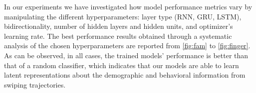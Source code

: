 \documentclass[sn-mathphys, pdflatex]{sn-jnl}
\begin{document}
In our experiments we have investigated how model performance metrics vary
by manipulating the different hyperparameters: layer type (RNN, GRU, LSTM), bidirectionality, number of hidden layers and hidden units, and optimizer's learning rate.
The best performance results obtained through a systematic analysis of the chosen hyperparameters
are reported from \autoref{fig:fam} to \autoref{fig:finger}.
As can be observed, in all cases, the trained models' performance is better than that of a random classifier,
which indicates that our models are able to learn latent representations
about the demographic and behavioral information from swiping trajectories.












\end{document}
